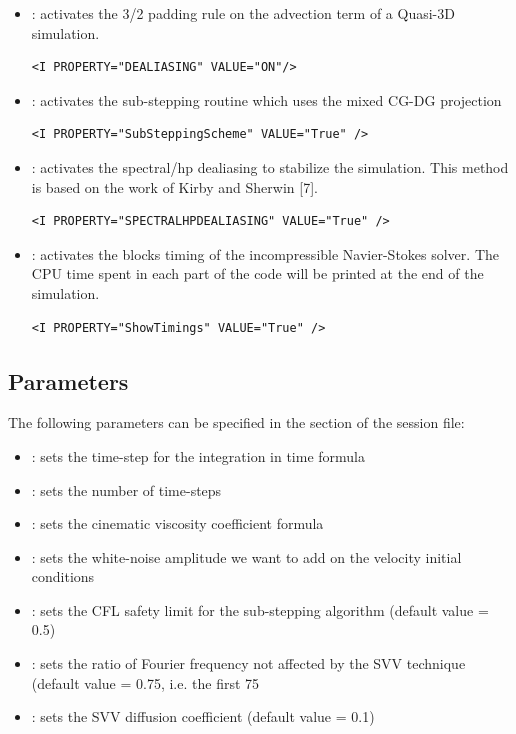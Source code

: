 \begin{itemize}
\item {}: activates the 3/2 padding rule on the advection term
of a Quasi-3D simulation.
\begin{lstlisting}[style=XMLStyle]
<I PROPERTY="DEALIASING" VALUE="ON"/>
\end{lstlisting}

\item {}: activates the sub-stepping routine which uses
the mixed CG-DG projection \begin{lstlisting}[style=XMLStyle]
<I PROPERTY="SubSteppingScheme" VALUE="True" />
\end{lstlisting}

\item {}: activates the spectral/hp dealiasing to
stabilize the simulation. This method is based on the work of Kirby and Sherwin [7].
\begin{lstlisting}[style=XMLStyle]
<I PROPERTY="SPECTRALHPDEALIASING" VALUE="True" />
\end{lstlisting}

\item {}: activates the blocks timing of the incompressible
Navier-Stokes solver. The CPU time spent in each part of the code will be
printed at the end of the simulation.
\begin{lstlisting}[style=XMLStyle]
<I PROPERTY="ShowTimings" VALUE="True" />
\end{lstlisting}

\end{itemize}


\subsection{Parameters}
The following parameters can be specified in the  section of
the session file:

\begin{itemize}
\item {}: sets the time-step for the integration in time formula
\item {}: sets the number of time-steps
\item {}: sets the cinematic viscosity coefficient formula
\item {}: sets the white-noise amplitude we want to add on the velocity initial conditions
\item {}: sets the CFL safety limit for the sub-stepping algorithm (default value = 0.5)
\item {}: sets the ratio of Fourier frequency not affected by the SVV technique (default value = 0.75, i.e. the first 75%
\item {}: sets the SVV diffusion coefficient (default value = 0.1)
\end{itemize}

